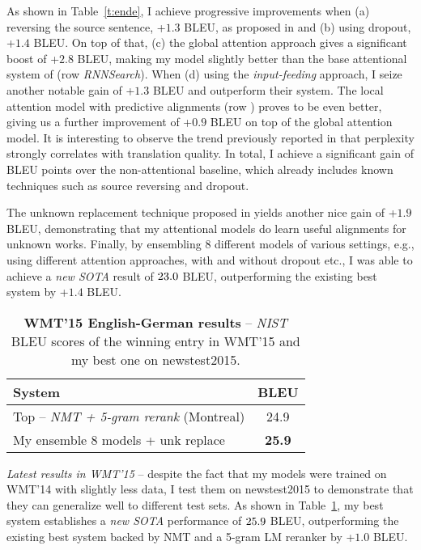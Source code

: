 \begin{sloppypar}
As shown in Table~\ref{t:ende}, I achieve progressive improvements when
(a) reversing the source sentence, +$1.3$ BLEU, as proposed in \cite{sutskever14}
and (b) using dropout, +$1.4$ BLEU. On top of that, (c) the global
attention approach gives a significant boost of +$2.8$ BLEU, making 
 my model slightly better than the base attentional system of
  (row {\it RNNSearch}). When (d) using the {\it input-feeding}
approach, I seize another notable gain of +$1.3$ BLEU and outperform their
system. The local attention model with predictive alignments (row {\it \localp}) proves
to be even better, giving us a further improvement of +$0.9$ BLEU on top of the
global attention model. 
It is interesting to observe the trend previously reported in
\cite{luong15} that perplexity strongly correlates with translation quality.
In total, I achieve a significant gain of
\attngain{} BLEU points over the non-attentional baseline, which already includes
known techniques such as source reversing and dropout.
\end{sloppypar}

The unknown replacement technique proposed in \cite{luong15,jean15} yields another nice
gain of +$1.9$ BLEU, demonstrating that my attentional models
do learn useful alignments for unknown works. Finally, by ensembling 8 different
models of various settings, e.g., using different attention approaches, with
and without dropout etc., I was able to achieve a {\it new SOTA} result of
$23.0{}$
BLEU, outperforming the existing best system \cite{jean15} by +$1.4$ BLEU.

\begin{table}[tbh!]
\centering
\begin{tabular}{l|c}
\bf{System} & \bf{BLEU}\\
  \hline
Top -- {\it NMT + 5-gram rerank} (Montreal) & 24.9 \\
  \hline
My ensemble 8 models + unk replace & {\bf 25.9} \\
\end{tabular}
\caption[WMT'15 English-German results]{{\bf WMT'15 English-German results} -- {\it NIST} BLEU scores of the
winning entry in WMT'15 and my best one on newstest2015.}
\label{t:wmt15ende}
\end{table}

{\it Latest results in WMT'15} -- despite the fact that my models were trained
on WMT'14 with slightly less data, I test them on newstest2015 to demonstrate
that they can generalize well to different test sets. As shown in Table~\ref{t:wmt15ende}, my best
system establishes a {\it new SOTA} performance of $25.9{}$ BLEU,
outperforming the existing best system backed by NMT and a 5-gram LM reranker
by +$1.0$
BLEU.

